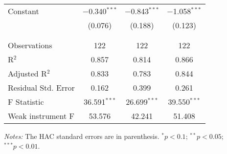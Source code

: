 \documentclass[11pt]{article}
\begin{document}
\begin{table}[!htbp]
\begin{threeparttable}
\begin{tabular}{@{\extracolsep{5pt}}lccc}
   Constant & $-$0.340$^{***}$ & $-$0.843$^{***}$ & $-$1.058$^{***}$ \\ 
    & (0.076) & (0.188) & (0.123) \\ 
    & & & \\ 
  \hline \\[-1.8ex] 
  Observations & 122 & 122 & 122 \\ 
  R$^{2}$ & 0.857 & 0.814 & 0.866 \\ 
  Adjusted R$^{2}$ & 0.833 & 0.783 & 0.844 \\ 
  Residual Std. Error & 0.162 & 0.399 & 0.261 \\ 
  F Statistic & 36.591$^{***}$ & 26.699$^{***}$ & 39.550$^{***}$ \\
  Weak instrument F & 53.576 & 42.241 & 51.408 \\
  \hline 
  \hline
\end{tabular} 
  \begin{tablenotes}[flushleft]
    \item[]\textit{Notes:} The \citet{Andrews1991} HAC standard errors are in parenthesis. $^{*}p<0.1$; $^{**}p<0.05$; $^{***}p<0.01$.
  \end{tablenotes}
\end{threeparttable}
  \end{table} 
\end{document}
